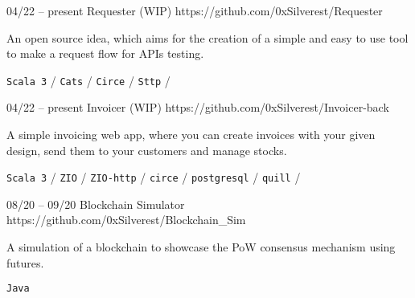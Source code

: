 \documentclass[10pt]{developercv} %
\begin{document}
\begin{entrylist}
	\entry
		{04/22 -- present}
		{Requester (WIP)}
		{https://github.com/0xSilverest/Requester}
        {
            An open source idea, which aims for the creation  of a simple
            and easy to use tool to make a request flow for APIs testing.

            \texttt {Scala 3} /
            \texttt {Cats} /
            \texttt {Circe} /
            \texttt {Sttp} /
        }

    \entry
		{04/22 -- present}
		{Invoicer (WIP)}
		{https://github.com/0xSilverest/Invoicer-back}
        {
            A simple invoicing web app, where you can create invoices with
            your given design, send them to your customers and manage stocks.

            \texttt {Scala 3} /
            \texttt {ZIO} /
            \texttt {ZIO-http} /
            \texttt {circe} /
            \texttt {postgresql} /
            \texttt {quill} /
        }

    \entry
		{08/20 -- 09/20}
		{Blockchain Simulator}
		{https://github.com/0xSilverest/Blockchain\_Sim}
        {A simulation of a blockchain to showcase the PoW consensus mechanism
            using futures.

            \texttt{Java}}
\end{entrylist}

\end{document}
